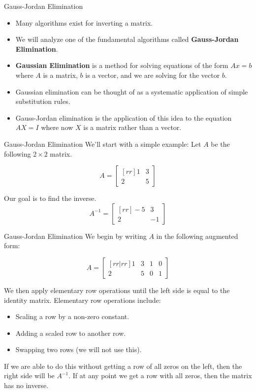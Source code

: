 \documentclass[serif,xcolor=pdftex,dvipsnames,table,hyperref={bookmarks=false,breaklinks}]{beamer}
\begin{document}
\begin{frame}[t]{Gauss-Jordan Elimination}
	\begin{itemize}[<+->]
		\item Many algorithms exist for inverting a matrix.
		\item We will analyze one of the fundamental algorithms called \textbf{Gauss-Jordan Elimination}.
		\item \textbf{Gaussian Elimination} is a method for solving equations of the form $Ax = b$ where $A$ is a matrix, $b$ is a vector, and we are solving for the vector $b$.
		\item Gaussian elimination can be thought of as a systematic application of simple substitution rules.
		\item Gauss-Jordan elimination is the application of this idea to the equation $AX = I$ where now $X$ is a matrix rather than a vector.
	\end{itemize}
\end{frame}

\begin{frame}[t]{Gauss-Jordan Elimination}
	We'll start with a simple example: Let $A$ be the following $2 \times 2$ matrix.
	
	\pause
	$$A = \begin{bmatrix}[rr]
    	1 & 3 \\
		2 & 5
	\end{bmatrix}$$
	
	\pause
	Our goal is to find the inverse.
	\pause
	$$A^{-1} = \begin{bmatrix}[rr]
    	-5 & 3 \\
		2 & -1
	\end{bmatrix}$$
	
\end{frame}

\begin{frame}[t]{Gauss-Jordan Elimination}
	We begin by writing $A$ in the following augmented form:
	
	\pause
	$$A = \begin{bmatrix}[rr|rr]
    	1 & 3 & 1 & 0\\
		2 & 5 & 0 & 1
	\end{bmatrix}$$
	
	\pause
	We then apply elementary row operations until the left side is equal to the identity matrix. Elementary row operations include:
	\pause
	\begin{itemize}[<+->]
		\item Scaling a row by a non-zero constant.
		\item Adding a scaled row to another row.
		\item Swapping two rows (we will not use this).
	\end{itemize}
	
	\pause
	If we are able to do this without getting a row of all zeros on the left, then the right side will be $A^{-1}$. If at any point we get a row with all zeros, then the matrix has no inverse.
	
\end{frame}
\end{document}
